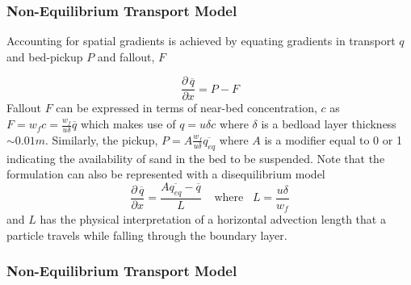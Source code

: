 \documentclass[aspectratio=169]{beamer}
\newcommand{\pdv}[2]{\frac{\partial \, #1}{\partial #2}}
\begin{document}
\begin{frame}
  \frametitle{Non-Equilibrium Transport Model} 

  Accounting for spatial gradients is achieved by equating gradients
  in transport $q$ and bed-pickup $P$ and fallout, $F$

  \begin{equation*}
    \pdv{\overline{q}}{x} = P-F 
  \end{equation*}
Fallout $F$ can be expressed in terms of near-bed concentration, $c$
as $F = w_f c = \frac{w_f}{u \delta} \overline{q} $ which makes use of
$q = u \delta c$ where $\delta$ is a bedload layer thickness $\sim 0.01m$.
Similarly, the pickup, $P = A \frac{w_f}{u \delta} \overline{q_{eq}}$
where $A$ is a modifier equal to 0 or 1 indicating the availability of sand in the bed
to be suspended.  Note that the formulation can also be represented with a disequilibrium model 
  \begin{equation*}
    \pdv{\overline{q}}{x} = \frac{A \overline{q_{eq}}  - \overline{q}}{L} \;\;\;\;\mbox{where}\;\;\; L = \frac{u \delta}{w_f}
  \end{equation*}
and $L$ has the physical interpretation of a horizontal advection
length that a particle travels while falling through the
boundary layer.
\end{frame}
\begin{frame}
  \frametitle{Non-Equilibrium Transport Model} 
  \centering
\end{frame}
\end{document}
